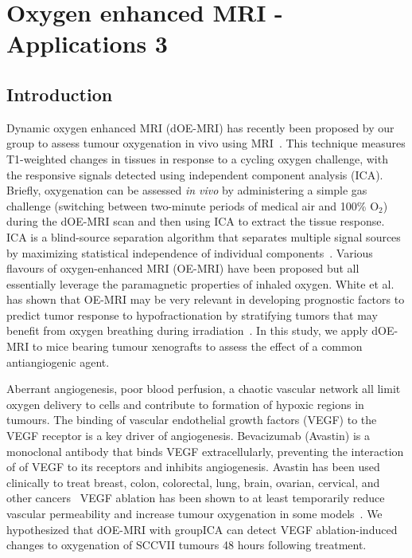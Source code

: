
\chapter{Oxygen enhanced MRI - Applications 3}
\label{ch:oemri3}

\section{Introduction}

Dynamic oxygen enhanced MRI (dOE-MRI) has recently been proposed by our group to assess tumour oxygenation in vivo using MRI~\cite{Moosvi:2018ca}. 
This technique measures T1-weighted changes in tissues in response to a cycling oxygen challenge, with the responsive signals detected using independent component analysis (ICA). 
Briefly, oxygenation can be assessed \emph{in vivo} by administering a simple gas challenge (switching between two-minute periods of medical air and 100\% O$_2$) during the dOE-MRI scan and then using ICA to extract the tissue response.
ICA is a blind-source separation algorithm that separates multiple signal sources by maximizing statistical independence of individual components~\cite{Hyvarinen:2000vk}.
Various flavours of oxygen-enhanced MRI (OE-MRI) have been proposed but all essentially leverage the paramagnetic properties of inhaled oxygen.
White et al. has shown that OE-MRI may be very relevant in developing prognostic factors to predict tumor response to hypofractionation by stratifying tumors that may benefit from oxygen breathing during irradiation~\cite{White:2016fz}.
In this study, we apply dOE-MRI to mice bearing tumour xenografts to assess the effect of a common antiangiogenic agent.

Aberrant angiogenesis, poor blood perfusion, a chaotic vascular network all limit oxygen delivery to cells and contribute to formation of hypoxic regions in tumours.
The binding of vascular endothelial growth factors (VEGF) to the VEGF receptor is a key driver of angiogenesis.
Bevacizumab (Avastin) is a monoclonal antibody that binds VEGF extracellularly, preventing the interaction of of VEGF to its receptors and inhibits angiogenesis. 
Avastin has been used clinically to treat breast, colon, colorectal, lung, brain, ovarian, cervical, and other cancers~\cite{AvastinIndications}%
VEGF ablation has been shown to at least temporarily reduce vascular permeability and increase tumour oxygenation in some models~\cite{OConnor:2012iea}. 
We hypothesized that dOE-MRI with groupICA can detect VEGF ablation-induced changes to oxygenation of SCCVII tumours 48 hours following treatment.

